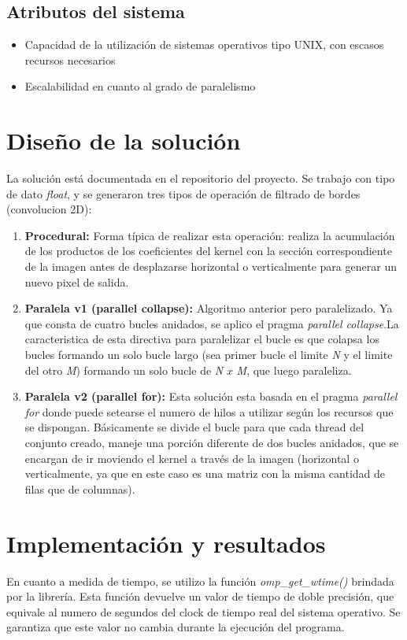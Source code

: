 \documentclass{article}
\begin{document}
\subsection{Atributos del sistema}
\begin{itemize}
\item Capacidad de la utilización de sistemas operativos tipo UNIX, con escasos recursos necesarios
\item Escalabilidad en cuanto al grado de paralelismo
\end{itemize}

\section{Diseño de la solución}
La solución está documentada en el repositorio del proyecto.
Se trabajo con tipo de dato \textit{float}, y se generaron tres tipos de operación de filtrado de bordes (convolucion 2D):\\
\begin{enumerate}
\item \textbf{Procedural:} Forma típica de realizar esta operación: realiza la acumulación de los productos de los coeficientes del kernel con la sección correspondiente de la imagen antes de desplazarse horizontal o verticalmente para generar un nuevo pixel de salida. 
\item \textbf{Paralela v1 (parallel collapse):} Algoritmo anterior pero paralelizado. Ya que consta de cuatro bucles anidados, se aplico el pragma \textit{parallel collapse}.La caracteristica de esta directiva para paralelizar el bucle es que colapsa los bucles formando un solo bucle largo (sea primer bucle el limite \textit{N} y el limite del otro \textit{M}) formando un solo bucle de \textit{N} $x$ \textit{M}, que luego paraleliza.\\
\item \textbf{Paralela v2 (parallel for):} Esta solución esta basada en el pragma \textit{parallel for} donde puede setearse el numero de hilos a utilizar según los recursos que se dispongan. Básicamente se divide el bucle para que cada thread del conjunto creado, maneje una porción diferente de dos bucles anidados, que se encargan de ir moviendo el kernel a través de la imagen (horizontal o verticalmente, ya que en este caso es una matriz con la misma cantidad de filas que de columnas).
\end{enumerate}
\section{Implementación y resultados}
En cuanto a medida de tiempo, se utilizo la función  \textit{omp\_get\_wtime()} brindada por la librería. Esta función devuelve un valor de tiempo de doble precisión, que equivale al numero de segundos del clock de tiempo real del sistema operativo. Se garantiza que este valor no cambia durante la ejecución del programa.\\
\end{document}
